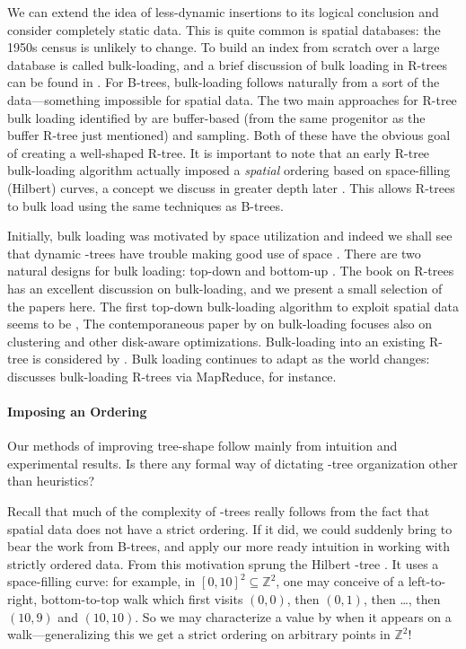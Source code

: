 We can extend the idea of less-dynamic insertions to its logical conclusion and consider completely static data.
This is quite common is spatial databases: the 1950s census is unlikely to change.
To build an index from scratch over a large database is called bulk-loading, and a brief discussion of bulk loading in R-trees can be found in \cite{berckenseeger01}.
For B-trees, bulk-loading follows naturally from a sort of the data---something impossible for spatial data.
The two main approaches for R-tree bulk loading identified by \cite{berckenseeger01} are buffer-based (from the same progenitor as the buffer R-tree just mentioned) and sampling.
Both of these have the obvious goal of creating a well-shaped R-tree.
It is important to note that an early R-tree bulk-loading algorithm actually imposed a \emph{spatial} ordering based on space-filling (Hilbert) curves, a concept we discuss in greater depth later \cite{kamelfaloutsos94}.
This allows R-trees to bulk load using the same techniques as B-trees.

Initially, bulk loading was motivated by space utilization \cite{garcialopezleutenegger98,kamelfaloutsos94} and indeed we shall see that dynamic \rbase-trees have trouble making good use of space \cite{huanglinlin01}.
There are two natural designs for bulk loading: top-down and bottom-up \cite{thebook}.
The book on R-trees \cite{thebook} has an excellent discussion on bulk-loading, and we present a small selection of the papers here.
The first top-down bulk-loading algorithm to exploit spatial data seems to be \cite{garcialopezleutenegger98},
The contemporaneous paper by \cite{berchtoldbohmkriegel98} on bulk-loading focuses also on clustering and other disk-aware optimizations.
Bulk-loading into an existing R-tree is considered by \cite{chenchoubeyrundensteiner98}.
Bulk loading continues to adapt as the world changes: \cite{tanluomaoni12} discusses bulk-loading R-trees via MapReduce, for instance.


\paragraph{Imposing an Ordering}
Our methods of improving tree-shape follow mainly from intuition and experimental results.
Is there any formal way of dictating \rbase-tree organization other than heuristics?

Recall that much of the complexity of \rbase-trees really follows from the fact that spatial data does not have a strict ordering.
If it did, we could suddenly bring to bear the work from B-trees, and apply our more ready intuition in working with strictly ordered data.
From this motivation sprung the Hilbert \rbase-tree \cite{kamelfaloutsos94}.
It uses a space-filling curve:
for example, in $[0,10]^2\subseteq\mathbb Z^2$, one may conceive of a left-to-right, bottom-to-top walk which first visits $(0,0)$, then $(0,1)$, then \ldots, then $(10,9)$ and $(10,10)$.
So we may characterize a value by when it appears on a walk---generalizing this we get a strict ordering on arbitrary points in $\mathbb Z^2$!

